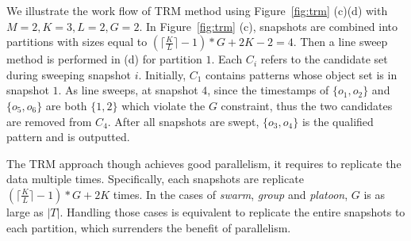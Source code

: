 \begin{example}
We illustrate the work flow of  TRM method using Figure~\ref{fig:trm} (c)(d) with $M=2, K=3, L = 2, G=2$. 
In Figure~\ref{fig:trm} (c), snapshots are combined into partitions with sizes equal to 
$(\lceil \frac{K}{L} \rceil-1) *G+2K - 2 = 4$. Then a line sweep method is performed in (d) 
for partition $1$. Each $C_i$ refers to the candidate set during sweeping snapshot $i$. 
Initially, $C_1$ contains patterns whose object set is in snapshot $1$.
As line sweeps, at snapshot $4$, since the timestamps of $\{o_1,o_2\}$ and $\{o_5,o_6\}$ 
are both $\{1,2\}$ which violate the $G$ constraint, 
thus the two candidates are removed from $C_4$. After all snapshots are swept, 
$\{o_3,o_4\}$ is the qualified pattern and is outputted.
\end{example}

The TRM approach though achieves good parallelism, 
it requires to replicate the data multiple times. 
Specifically, each snapshots are replicate $(\lceil \frac{K}{L} \rceil -1) *G+2K$ times. 
In the cases of \emph{swarm}, \emph{group} and \emph{platoon}, $G$ is as large as $|T|$. 
Handling those cases is equivalent to replicate the entire snapshots to each partition, 
which surrenders the benefit of parallelism.



